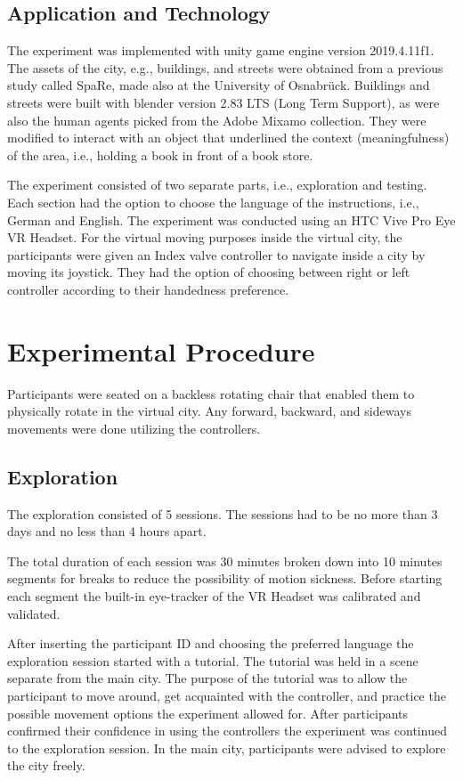 \subsection{Application and Technology}

The experiment was implemented with unity game engine \autocite{haas2014history} version 2019.4.11f1. The assets of the city, e.g., buildings, and streets were obtained from a previous study called SpaRe, made also at the University of Osnabrück. Buildings and streets were built with blender \autocite{Hess:2010:BFE:1893021} version 2.83 LTS (Long Term Support), as were also the human agents picked from the Adobe Mixamo \autocite{mixamo} collection. They were modified to interact with an object that underlined the context (meaningfulness) of the area, i.e., holding a book in front of a book store. 

The experiment consisted of two separate parts, i.e., exploration and testing.  Each section had the option to choose the language of the instructions, i.e., German and English. The experiment was conducted using an HTC Vive Pro Eye VR Headset. For the virtual moving purposes inside the virtual city, the participants were given an Index valve controller to navigate inside a city by moving its joystick. They had the option of choosing between right or left controller according to their handedness preference.

\section{Experimental Procedure}

Participants were seated on a backless rotating chair that enabled them to physically rotate in the virtual city. Any forward, backward, and sideways movements were done utilizing the controllers.

\subsection{Exploration}

The exploration consisted of 5 sessions. The sessions had to be no more than 3 days and no less than 4 hours apart. 

The total duration of each session was 30 minutes broken down into 10 minutes segments for breaks to reduce the possibility of motion sickness. Before starting each segment the built-in eye-tracker of the VR Headset was calibrated and validated. 

After inserting the participant ID and choosing the preferred language the exploration session started with a tutorial. The tutorial was held in a scene separate from the main city. The purpose of the tutorial was to allow the participant to move around, get acquainted with the controller, and practice the possible movement options the experiment allowed for. After participants confirmed their confidence in using the controllers the experiment was continued to the exploration session. In the main city, participants were advised to explore the city freely.

